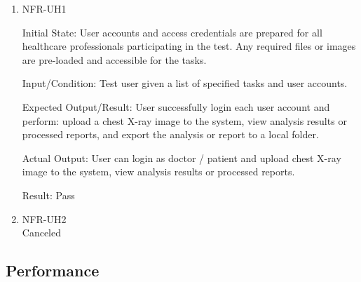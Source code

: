 \documentclass[12pt, titlepage]{article}
\begin{document}
\begin{enumerate}

\item{NFR-UH1\\}\label{NFR-UH1}

Initial State: User accounts and access credentials are prepared for all healthcare professionals participating in the test. Any required files or images are pre-loaded and accessible for the tasks.

Input/Condition: Test user given a list of specified tasks and user accounts.

Expected Output/Result: User successfully login each user account and perform: upload a chest X-ray image to the system, view analysis results or processed reports, and export the analysis or report to a local folder.

Actual Output: User can login as doctor / patient and upload chest X-ray image to the system, view analysis results or processed reports.

Result: Pass

\item{NFR-UH2\\}\label{NFR-UH2}
Canceled

\end{enumerate}

\subsection{Performance}
\end{document}
